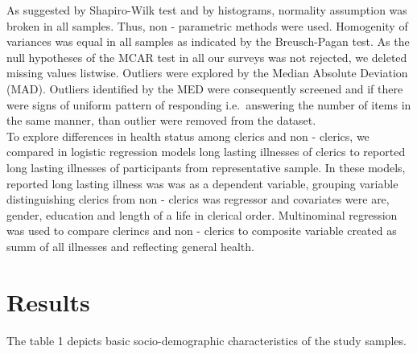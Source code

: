 \documentclass[ijerph,article,accept,moreauthors,pdftex]{mdpi}
\begin{document}
As suggested by Shapiro-Wilk test and by histograms, normality
assumption was broken in all samples. Thus, non - parametric methods
were used. Homogenity of variances was equal in all samples as indicated
by the Breusch-Pagan test. As the null hypotheses of the MCAR test in
all our surveys was not rejected, we deleted missing values listwise.
Outliers were explored by the Median Absolute Deviation (MAD). Outliers
identified by the MED were consequently screened and if there were signs
of uniform pattern of responding i.e.~answering the number of items in
the same manner, than outlier were removed from the dataset.\\
To explore differences in health status among clerics and non - clerics,
we compared in logistic regression models long lasting illnesses of
clerics to reported long lasting illnesses of participants from
representative sample. In these models, reported long lasting illness
was was as a dependent variable, grouping variable distinguishing
clerics from non - clerics was regressor and covariates were are,
gender, education and length of a life in clerical order. Multinominal
regression was used to compare clerincs and non - clerics to composite
variable created as summ of all illnesses and reflecting general health.

\hypertarget{results}{%
\section{Results}\label{results}}

The table 1 depicts basic socio-demographic characteristics of the study
samples.

\newpage
\end{document}
